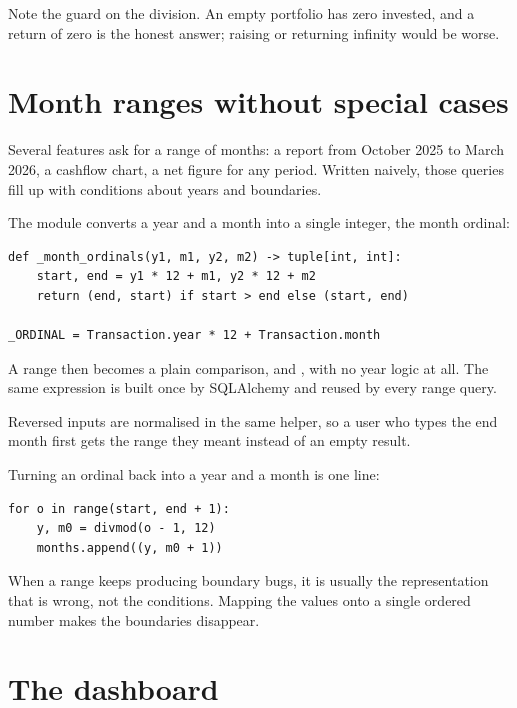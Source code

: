 Note the guard on the division. An empty portfolio has zero invested, and a
return of zero is the honest answer; raising or returning infinity would be
worse.

\section{Month ranges without special cases}

Several features ask for a range of months: a report from October 2025 to March
2026, a cashflow chart, a net figure for any period. Written naively, those
queries fill up with conditions about years and boundaries.

The module converts a year and a month into a single integer, the month ordinal:

\begin{lstlisting}[style=py]
def _month_ordinals(y1, m1, y2, m2) -> tuple[int, int]:
    start, end = y1 * 12 + m1, y2 * 12 + m2
    return (end, start) if start > end else (start, end)

_ORDINAL = Transaction.year * 12 + Transaction.month
\end{lstlisting}

A range then becomes a plain comparison,  and
, with no year logic at all. The same expression is built
once by SQLAlchemy and reused by every range query.

Reversed inputs are normalised in the same helper, so a user who types the end
month first gets the range they meant instead of an empty result.

Turning an ordinal back into a year and a month is one line:

\begin{lstlisting}[style=py]
for o in range(start, end + 1):
    y, m0 = divmod(o - 1, 12)
    months.append((y, m0 + 1))
\end{lstlisting}

\begin{keypoint}
When a range keeps producing boundary bugs, it is usually the representation
that is wrong, not the conditions. Mapping the values onto a single ordered
number makes the boundaries disappear.
\end{keypoint}

\section{The dashboard}

